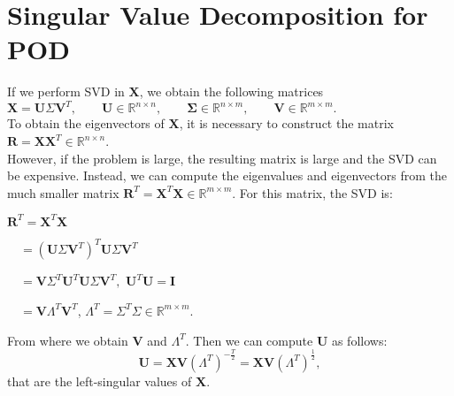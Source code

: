 \documentclass[12pt]{article}
\numberwithin{equation}{section}
\begin{document}
\section{Singular Value Decomposition for POD}\label{a3}
If we perform SVD in $\mathbf{X}$, we obtain the following matrices \\
$\mathbf{X}=\mathbf{U}\Sigma \mathbf{V}^T, \qquad \mathbf{U}\in\mathbb{R}^{n \times n},\qquad \mathbf{\Sigma}\in\mathbb{R}^{n \times m}, \qquad \mathbf{V}\in\mathbb{R}^{m \times m}.$\\
To obtain the eigenvectors of $\mathbf{X}$, it is necessary to construct the matrix $\mathbf{R}= \mathbf{X}\mathbf{X}^T\in\mathbb{R}^{n \times n}$.\\ However, if the problem is large, the resulting matrix is large and the SVD can be expensive. Instead, we can compute the eigenvalues and eigenvectors from the much smaller matrix $\mathbf{R}^T= \mathbf{X}^T\mathbf{X}\in\mathbb{R}^{m \times m}$. For this matrix, the SVD is:
\begin{itemize}
\begin{minipage}{.4\textwidth}
\item[] $\mathbf{R}^T= \mathbf{X}^T\mathbf{X}$
 \item[] $\quad=(\mathbf{U}\Sigma \mathbf{V}^T)^T\mathbf{U}\Sigma \mathbf{V}^T$
 \item[] $\quad=\mathbf{V}\Sigma ^T\mathbf{U}^T\mathbf{U}\Sigma \mathbf{V}^T,$ $\mathbf{U}^T\mathbf{U}=\mathbf{I}$ 
  \item[] $\quad=\mathbf{V}\Lambda^T \mathbf{V}^T$, 
  $\Lambda^T=\Sigma ^T\Sigma \in\mathbb{R}^{m \times m}.$
\end{minipage}
\end{itemize}
From where we obtain $\mathbf{V}$ and $\Lambda^T$. Then we can compute $\mathbf{U}$ as follows:
$$\mathbf{U}=\mathbf{X}\mathbf{V}(\Lambda^T)^{-\frac{T}{2}}=\mathbf{X}\mathbf{V}(\Lambda^T)^{\frac{1}{2}},$$
that are the left-singular values of $\mathbf{X}.$
\end{document}
